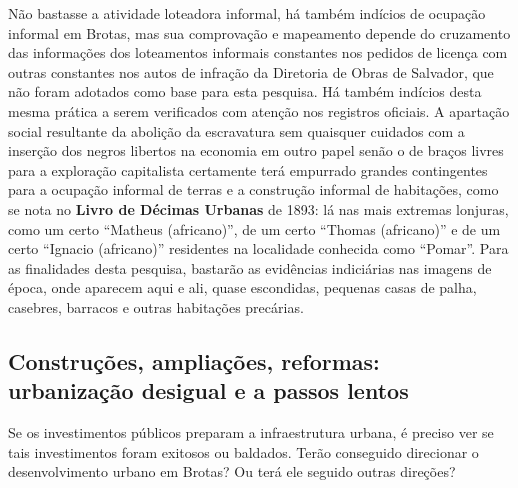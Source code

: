 Não bastasse a atividade loteadora informal, há também indícios de ocupação informal em Brotas, mas sua comprovação e mapeamento depende do cruzamento das informações dos loteamentos informais constantes nos pedidos de licença com outras constantes nos autos de infração da Diretoria de Obras de Salvador, que não foram adotados como base para esta pesquisa. Há também indícios desta mesma prática a serem verificados com atenção nos registros oficiais. A apartação social resultante da abolição da escravatura sem quaisquer cuidados com a inserção dos negros libertos na economia em outro papel senão o de braços livres para a exploração capitalista certamente terá empurrado grandes contingentes para a ocupação informal de terras e a construção informal de habitações, como se nota no \textbf{Livro de Décimas Urbanas} de 1893: lá nas mais extremas lonjuras, como um certo ``Matheus (africano)'', de um certo ``Thomas (africano)'' e de um certo ``Ignacio (africano)'' residentes na localidade conhecida como ``Pomar''. Para as finalidades desta pesquisa, bastarão as evidências indiciárias nas imagens de época, onde aparecem aqui e ali, quase escondidas, pequenas casas de palha, casebres, barracos e outras habitações precárias.

\subsection{Construções, ampliações, reformas: urbanização desigual e a passos lentos}\label{subsec:constrampliref}

Se os investimentos públicos preparam a infraestrutura urbana, é preciso ver se tais investimentos foram exitosos ou baldados. Terão conseguido direcionar o desenvolvimento urbano em Brotas? Ou terá ele seguido outras direções?


